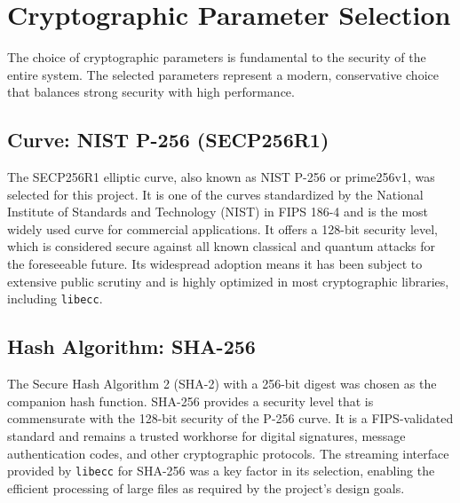 \section{Cryptographic Parameter Selection}
The choice of cryptographic parameters is fundamental to the security of the entire system. The selected parameters represent a modern, conservative choice that balances strong security with high performance.

\subsection{Curve: NIST P-256 (SECP256R1)}
The SECP256R1 elliptic curve, also known as NIST P-256 or prime256v1, was selected for this project. It is one of the curves standardized by the National Institute of Standards and Technology (NIST) in FIPS 186-4 and is the most widely used curve for commercial applications. It offers a 128-bit security level, which is considered secure against all known classical and quantum attacks for the foreseeable future. Its widespread adoption means it has been subject to extensive public scrutiny and is highly optimized in most cryptographic libraries, including \texttt{libecc}.

\subsection{Hash Algorithm: SHA-256}
The Secure Hash Algorithm 2 (SHA-2) with a 256-bit digest was chosen as the companion hash function. SHA-256 provides a security level that is commensurate with the 128-bit security of the P-256 curve. It is a FIPS-validated standard and remains a trusted workhorse for digital signatures, message authentication codes, and other cryptographic protocols. The streaming interface provided by \texttt{libecc} for SHA-256 was a key factor in its selection, enabling the efficient processing of large files as required by the project's design goals.